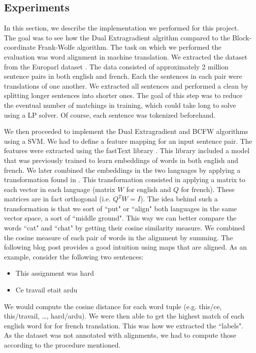 \subsection{Experiments}

In this section, we describe the implementation we performed for this project.
The goal was to see how the Dual Extragradient algrithm compared to the
Block-coordinate Frank-Wolfe algorithm. The task on which we performed the
evaluation was word alignment in machine translation. We extracted the dataset
from the Europarl dataset \cite{EuroparlParallelCorpus}. The data consisted of
approximately 2 million sentence pairs in both english and french. Each the
sentences in each pair were translations of one another. We extracted all
sentences and performed a clean by splitting longer sentences into shorter ones.
The goal of this step was to reduce the eventual number of matchings in
training, which could take long to solve using a LP solver. Of course, each
sentence was tokenized beforehand.

We then proceeded to implement the Dual Extragradient and BCFW algorithms using
a SVM. We had to define a feature mapping for an input sentence pair. The
features were extracted using the fastText library \cite{fastText}. This library
included a model that was previously trained to learn embeddings of words in
both english and french. We later combined the embeddings in the two languages
by applying a transformation found in \citet{chojnackiRandomGraphGenerator2010}.
This transformation consisted in applying a matrix to each vector in each
language (matrix $W$ for english and $Q$ for french). These matrices are in fact
orthogonal (i.e. $Q^T W = I$). The idea behind such a transformation is that we
sort of ``put" or ``align" both languages in the same vector space, a sort of
``middle ground". This way we can better compare the words ``cat" and ``chat" by
getting their cosine similarity measure. We combined the cosine measure of each
pair of words in the alignment by summing. The following blog post
\citet{AligningVectorRepresentations2017} provides a good intuition using maps
that are aligned.
As an example, consider the following two sentences:
\begin{itemize}
  \item This assignment was hard
  \item Ce travail etait ardu
\end{itemize}
We would compute the cosine distance for each word tuple (e.g. this/ce, this/travail,
\dots, hard/ardu). We were then able to get the highest match of each english word for
for french translation. This was how we extracted the ``labels". As the dataset was
not annotated with alignments, we had to compute those according to the procedure mentioned.

